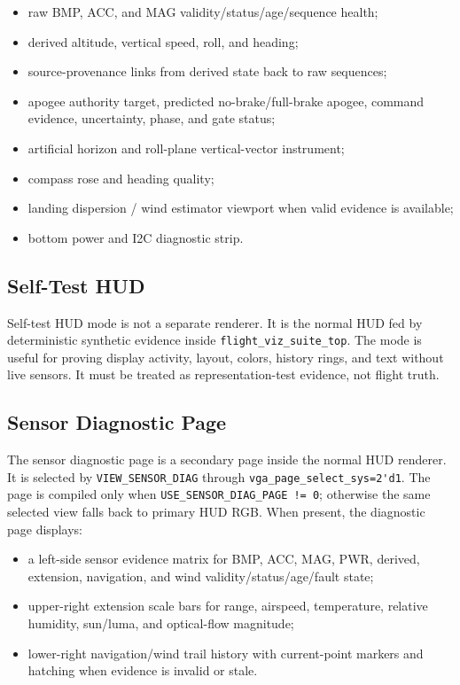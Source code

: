 \documentclass{article}
\newcommand{\sig}[1]{\begingroup\nolinkurl{#1}\endgroup}
\newcommand{\file}[1]{\begingroup\nolinkurl{#1}\endgroup}
\newcommand{\param}[1]{\begingroup\nolinkurl{#1}\endgroup}
\begin{document}
\begin{itemize}
  \item raw BMP, ACC, and MAG validity/status/age/sequence health;
  \item derived altitude, vertical speed, roll, and heading;
  \item source-provenance links from derived state back to raw sequences;
  \item apogee authority target, predicted no-brake/full-brake apogee, command
        evidence, uncertainty, phase, and gate status;
  \item artificial horizon and roll-plane vertical-vector instrument;
  \item compass rose and heading quality;
  \item landing dispersion / wind estimator viewport when valid evidence is
        available;
  \item bottom power and I2C diagnostic strip.
\end{itemize}

\subsection{Self-Test HUD}

Self-test HUD mode is not a separate renderer.  It is the normal HUD fed by
deterministic synthetic evidence inside \file{flight_viz_suite_top}.  The mode
is useful for proving display activity, layout, colors, history rings, and text
without live sensors.  It must be treated as representation-test evidence, not
flight truth.

\subsection{Sensor Diagnostic Page}

The sensor diagnostic page is a secondary page inside the normal HUD renderer.
It is selected by \sig{VIEW_SENSOR_DIAG} through
\sig{vga_page_select_sys=2'd1}.  The page is compiled only when
\param{USE_SENSOR_DIAG_PAGE != 0}; otherwise the same selected view falls back
to primary HUD RGB.  When present, the diagnostic page displays:

\begin{itemize}
  \item a left-side sensor evidence matrix for BMP, ACC, MAG, PWR, derived,
        extension, navigation, and wind validity/status/age/fault state;
  \item upper-right extension scale bars for range, airspeed, temperature,
        relative humidity, sun/luma, and optical-flow magnitude;
  \item lower-right navigation/wind trail history with current-point markers
        and hatching when evidence is invalid or stale.
\end{itemize}
\end{document}
